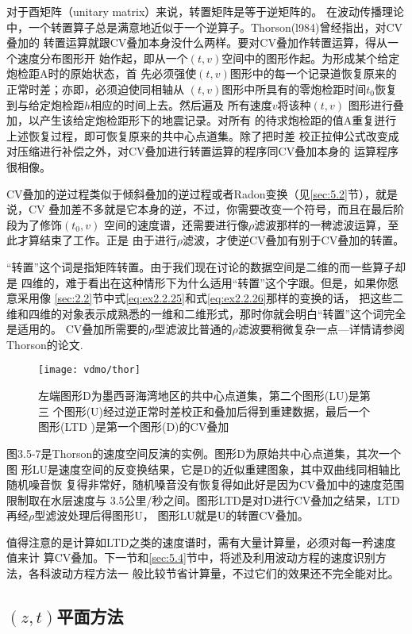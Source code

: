 对于酉矩阵（unitary matrix）来说，转置矩阵是等于逆矩阵的。
在波动传播理论
中，一个转置算子总是满意地近似于一个逆算子。Thorson(l984)曾经指出，对CV叠加的
转置运算就跟CV叠加本身没什么两样。要对CV叠加作转置运算，得从一个速度分布图形开
始作起，即从一个$(t,v)$空间中的图形作起。为形成某个给定炮检距A时的原始状态，首
先必须强使$(t,v)$图形中的每一个记录道恢复原来的正常时差；亦即，必须迫使同相轴从
$(t,v)$图形中所具有的零炮检距时间$t_0$恢复到与给定炮检距$h$相应的时间上去。然后遍及
所有速度$v$将该种$(t,v)$
图形进行叠加，以产生该给定炮检距形下的地震记录。对所有
的待求炮检距的值A重复迸行上述恢复过程，即可恢复原来的共中心点道集。除了把时差
校正拉伸公式改变成对压缩进行补偿之外，对CV叠加进行转置运算的程序同CV叠加本身的
运算程序很相像。

CV叠加的逆过程类似于倾斜叠加的逆过程或者Radon变换（见\ref{sec:5.2}节），就是说，CV
叠加差不多就是它本身的逆，不过，你需要改变一个符号，而且在最后阶段为了修饰$(t_0,v)$
空间的速度谱，还需要进行像$\rho$滤波那样的一稗滤波运算，至此才算结束了工作。正是
由于进行$\rho$滤波，才使逆CV叠加有别于CV叠加的转置。

“转置”这个词是指矩阵转置。由于我们现在讨论的数据空间是二维的而一些算子却是
四维的，难于看出在这种情形下为什么适用“转置”这个字跟。但是，如果你愿意采用像
\ref{sec:2.2}节中式\ref{eq:ex2.2.25}和式\ref{eq:ex2.2.26}那样的变换的话，
把这些二维和四维的对象表示成熟悉的一维和二维形式，那时你就会明白“转置”这个词完全是适用的。
CV叠加所需要的$\rho$型滤波比普通的$\rho$滤波要稍微复杂一点---详情请参阅Thorson的论文.

\begin{figure}[H]
\centering
\texttt{[image: vdmo/thor]}
\caption[thor]{左端图形D为墨西哥海湾地区的共中心点道集，第二个图形(LU)是第三
个图形(U)经过逆正常时差校正和叠加后得到重建数据，最后一个图形(LTD
)是第一个图形(D)的CV叠加}
\label{fig:vdmo/thor}
\end{figure}

图3.5-7是Thorson的速度空间反演的实例。图形D为原始共中心点道集，其次一个图
形LU是速度空间的反变换结果，它是D的近似重建图象，其中双曲线同相轴比随机噪音恢
复得非常好，随机嗓音没有恢复得如此好是因为CV叠加中的速度范围限制取在水层速度与
3.5公里/秒之间。图形LTD是对D进行CV叠加之结杲，LTD再经$\rho$型滤波处理后得图形U，
图形LU就是U的转置CV叠加。

值得注意的是计算如LTD之类的速度谱时，需有大量计算量，必须对每一矜速度值来计
算CV叠加。下一节和\ref{sec:5.4}节中，将述及利用波动方程的速度识别方法，各科波动方程方法一
般比较节省计算量，不过它们的效果还不完全能对比。

\subsection{$(z,t)$平面方法}
\label{sec:3.5.8}

